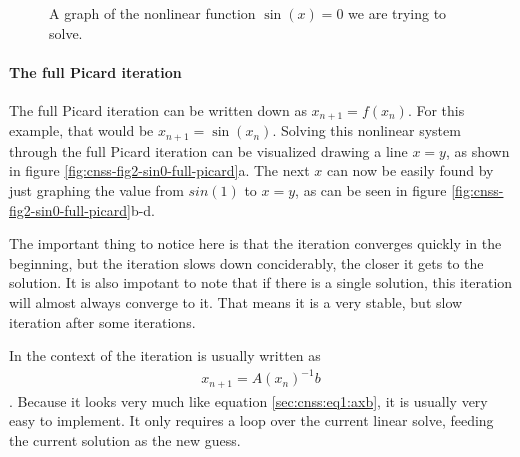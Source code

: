 \begin{figure}
    \label{fig:cnss-fig1-sin0}
\caption{A graph of the nonlinear function {$\sin(x)=0$} we are trying to solve.}
\end{figure}

\paragraph{The full Picard iteration}

The full Picard iteration can be written down as $x_{n+1} = f(x_{n})$. For this example, 
that would be $x_{n+1} = \sin(x_{n})$. Solving this nonlinear system through the full Picard 
iteration can be visualized drawing a line $x = y$, as shown in figure 
\ref{fig:cnss-fig2-sin0-full-picard}a. The next $x$ can now be easily found by just graphing 
the value from $sin(1)$ to $x = y$, as can be seen in figure \ref{fig:cnss-fig2-sin0-full-picard}b-d.

The important thing to notice here is that the iteration converges quickly in the beginning, 
but the iteration slows down conciderably, the closer it gets to the solution. It is also 
impotant to note that if there is a single solution, this iteration will almost always 
converge to it. That means it is a very stable, but slow iteration after some iterations. 

In the context of \aspect{} the iteration is usually written as 
\begin{align}
    x_{n+1} = A(x_n)^{-1}b
\end{align}. Because it looks very much like equation \ref{sec:cnss:eq1:axb}, it is usually 
very easy to implement. It only requires a loop over the current linear solve, feeding 
the current solution as the new guess.

